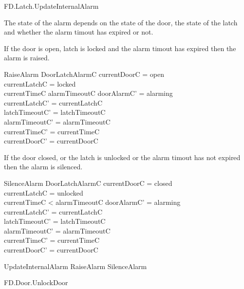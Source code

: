 \begin{traceunit}{FD.Latch.UpdateInternalAlarm}
\end{traceunit}

The state of the alarm depends on the state of the door, the state of
the latch and whether the alarm timout has expired
or not. 

If the door is open, latch is locked and the alarm timout has expired
then the alarm is raised.

\begin{schema}{RaiseAlarm}
        \Delta DoorLatchAlarmC
\where
        currentDoorC = open
\\      currentLatchC = locked 
\\      currentTimeC \geq alarmTimeoutC 
\also
        doorAlarmC' = alarming
\\      currentLatchC' = currentLatchC
\\      latchTimeoutC' = latchTimeoutC
\\      alarmTimeoutC' = alarmTimeoutC 
\\      currentTimeC' = currentTimeC
\\      currentDoorC' = currentDoorC
\end{schema}

If the door closed, or the latch is unlocked or the alarm timout has not expired
then the alarm is silenced.


\begin{schema}{SilenceAlarm}
        \Delta DoorLatchAlarmC
\where
        currentDoorC = closed 
\\      \lor currentLatchC = unlocked 
\\      \lor currentTimeC < alarmTimeoutC 
\also
        doorAlarmC' = alarming
\\      currentLatchC' = currentLatchC
\\      latchTimeoutC' = latchTimeoutC
\\      alarmTimeoutC' = alarmTimeoutC 
\\      currentTimeC' = currentTimeC
\\      currentDoorC' = currentDoorC
\end{schema}

\begin{zed}
        UpdateInternalAlarm  RaiseAlarm \lor SilenceAlarm 
\end{zed}


\begin{traceunit}{FD.Door.UnlockDoor}
\end{traceunit}


